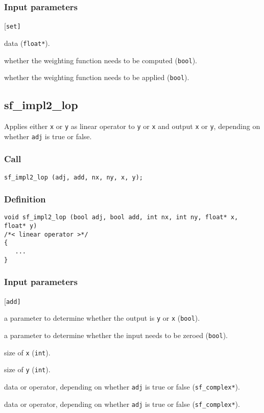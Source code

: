 \subsubsection*{Input parameters}
\begin{desclist}{\tt }{\quad}[\tt set]
   \setlength\itemsep{0pt}
   \item[x]   data (\texttt{float*}).  
   \item[set] whether the weighting function needs to be computed (\texttt{bool}).  
   \item[adj] whether the weighting function needs to be applied (\texttt{bool}).  
\end{desclist}





\subsection{{sf\_impl2\_lop}}
Applies either \texttt{x} or \texttt{y} as linear operator to \texttt{y} or \texttt{x} and output \texttt{x} or \texttt{y}, depending on whether \texttt{adj} is true or false.

\subsubsection*{Call}
\begin{verbatim}sf_impl2_lop (adj, add, nx, ny, x, y);\end{verbatim}

\subsubsection*{Definition}
\begin{verbatim}
void sf_impl2_lop (bool adj, bool add, int nx, int ny, float* x, float* y)
/*< linear operator >*/
{
   ...
}
\end{verbatim}

\subsubsection*{Input parameters}
\begin{desclist}{\tt }{\quad}[\tt add]
   \setlength\itemsep{0pt}
   \item[adj] a parameter to determine whether the output is \texttt{y} or \texttt{x} (\texttt{bool}).
   \item[add] a parameter to determine whether the input needs to be zeroed (\texttt{bool}).
   \item[nx]  size of \texttt{x} (\texttt{int}).
   \item[ny]  size of \texttt{y} (\texttt{int}).
   \item[x]   data or operator, depending on whether \texttt{adj} is true or false (\texttt{sf\_complex*}).
   \item[y]   data or operator, depending on whether \texttt{adj} is true or false (\texttt{sf\_complex*}).
\end{desclist}



